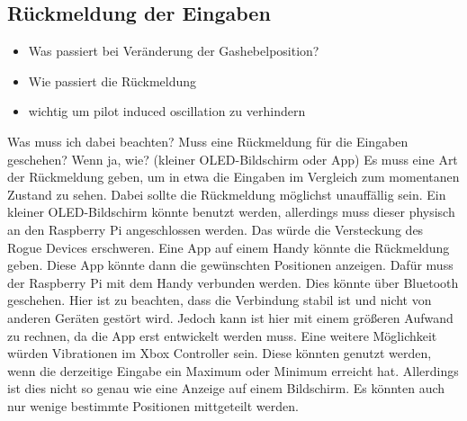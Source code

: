 \subsection{Rückmeldung der Eingaben}
\begin{itemize}
    \item Was passiert bei Veränderung der Gashebelposition?
    \item Wie passiert die Rückmeldung
    \item wichtig um pilot induced oscillation zu verhindern
\end{itemize}
Was muss ich dabei beachten?
Muss eine Rückmeldung für die Eingaben geschehen? Wenn ja, wie?
(kleiner OLED-Bildschirm oder App)
Es muss eine Art der Rückmeldung geben, um in etwa die Eingaben im Vergleich zum momentanen Zustand zu sehen.
Dabei sollte die Rückmeldung möglichst unauffällig sein. Ein kleiner OLED-Bildschirm könnte benutzt werden, allerdings
muss dieser physisch an den Raspberry Pi angeschlossen werden. Das würde die Versteckung des Rogue Devices erschweren.
Eine App auf einem Handy könnte die Rückmeldung geben. Diese App könnte dann die gewünschten Positionen anzeigen.
Dafür muss der Raspberry Pi mit dem Handy verbunden werden. Dies könnte über Bluetooth geschehen.
Hier ist zu beachten, dass die Verbindung stabil ist und nicht von anderen Geräten gestört wird.
Jedoch kann ist hier mit einem größeren Aufwand zu rechnen, da die App erst entwickelt werden muss.
Eine weitere Möglichkeit würden Vibrationen im Xbox Controller sein. Diese könnten genutzt werden, wenn die derzeitige
Eingabe ein Maximum oder Minimum erreicht hat. Allerdings ist dies nicht so genau wie eine Anzeige auf einem Bildschirm.
Es könnten auch nur wenige bestimmte Positionen mittgeteilt werden.